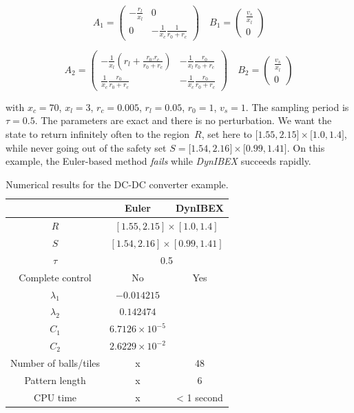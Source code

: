 $$ A_1 = \left( \begin{matrix}
          - \frac{r_l}{x_l} & 0 \\ 0 & - \frac{1}{x_c} \frac{1}{r_0 + r_c}
         \end{matrix} \right)  \quad B_1 = \left( \begin{matrix}
         \frac{v_s}{x_l} \\ 0 \end{matrix} \right) $$


$$ A_2 = \left( \begin{matrix} - \frac{1}{x_l} (r_l +
  \frac{r_0.r_c}{r_0 + r_c}) & - \frac{1}{x_l} \frac{r_0}{r_0 + r_c}
  \\ \frac{1}{x_c}\frac{r_0}{r_0 + r_c} & - \frac{1}{x_c}
  \frac{r_0}{r_0 + r_c}
         \end{matrix} \right)  \quad B_2 = \left( \begin{matrix}
         \frac{v_s}{x_l} \\ 0 \end{matrix} \right)  $$

with $x_c = 70$, $x_l = 3$, $r_c = 0.005$, $r_l = 0.05$, $r_0 = 1$,
$v_s = 1$.  The sampling period is $\tau = 0.5$.  The parameters are
exact and there is no perturbation.  We want the state to return
infinitely often to the region~$R$, set here to $\lbrack 1.55 , 2.15
\rbrack \times \lbrack 1.0 , 1.4 \rbrack$, while never going out of
the safety set $S = \lbrack 1.54 , 2.16 \rbrack \times \lbrack 0.99 ,
1.41 \rbrack$.
%
On this example, the Euler-based method {\em fails} while {\em DynIBEX} succeeds
rapidly.


\begin{table}[h]
 \centering
\begin{tabular}{|c|c|c|}
\hline 
 &\multicolumn{1}{c|}{Euler} & \multicolumn{1}{c|}{DynIBEX} \\
\hline
$R$ & \multicolumn{2}{c|}{$[1.55,2.15]\times[1.0,1.4]$} \\
$S$ & \multicolumn{2}{c|}{$[1.54,2.16]\times[0.99,1.41]$} \\
\hline
$\tau$ &\multicolumn{2}{c|}{ 0.5 }\\
\hline
 Complete control & No & Yes\\
\hline
$\lambda_1$  & $-0.014215$ &\\
$\lambda_2$  & $0.142474$ &\\
$C_{1}$  & $6.7126 \times 10^{-5}$ &\\
$C_{2}$ &  $2.6229 \times 10^{-2}$ &\\
\hline
Number of balls/tiles & x & 48 \\
\hline
Pattern length & x & 6 \\
\hline
CPU time & x & < 1 second \\ \hline
 \end{tabular}
\label{table:DC}
\caption{Numerical results for the DC-DC converter example.}
 \end{table}



